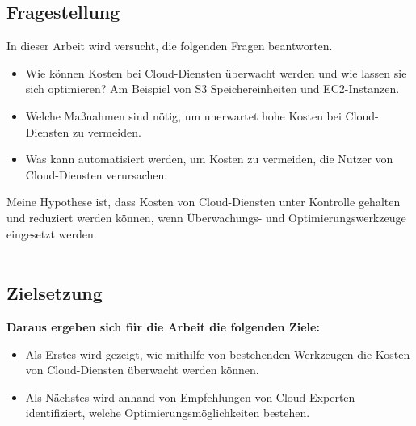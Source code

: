 \subsection*{Fragestellung}

\begin{flushleft}
In dieser Arbeit wird versucht, die folgenden Fragen beantworten. 
\end{flushleft}

\begin{itemize}
    \item
        Wie können Kosten bei Cloud-Diensten überwacht werden und wie lassen sie sich optimieren? 
        Am Beispiel von S3 Speichereinheiten und EC2-Instanzen.
    \item
        Welche Maßnahmen sind nötig, um unerwartet hohe Kosten bei Cloud-Diensten zu vermeiden.
    \item 
        Was kann automatisiert werden, um Kosten zu vermeiden, die Nutzer von Cloud-Diensten verursachen.  
\end{itemize}
Meine Hypothese ist, dass Kosten von Cloud-Diensten unter Kontrolle gehalten und
reduziert werden können, wenn Überwachungs- und Optimierungswerkzeuge eingesetzt werden.
\\\\

\subsection*{Zielsetzung}

\textbf{Daraus ergeben sich für die Arbeit die folgenden Ziele:}\\ 
\begin{itemize}
    \item
        Als Erstes wird gezeigt, wie mithilfe von bestehenden Werkzeugen  die Kosten von Cloud-Diensten überwacht werden können.
    \item
        Als Nächstes wird anhand von Empfehlungen von Cloud-Experten identifiziert, welche Optimierungsmöglichkeiten bestehen.\\
\end{itemize}

